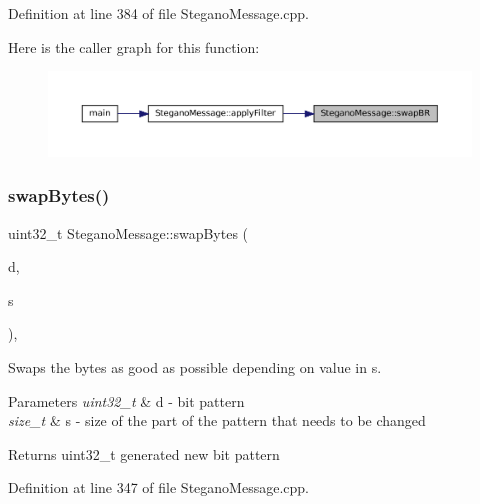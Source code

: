 Definition at line 384 of file Stegano\+Message.\+cpp.

Here is the caller graph for this function\+:\nopagebreak
\begin{figure}[H]
\begin{center}
\leavevmode
\includegraphics[width=350pt]{classSteganoMessage_a530e5ee67cf45ac56f8f3be4d2b44d2e_icgraph}
\end{center}
\end{figure}
\mbox{\label{classSteganoMessage_af80189e6fb64aa4ae6cc48f92eaec147}} 
\subsubsection{\texorpdfstring{swapBytes()}{swapBytes()}}
{\footnotesize\ttfamily uint32\+\_\+t Stegano\+Message\+::swap\+Bytes (\begin{DoxyParamCaption}\item[{uint32\+\_\+t}]{d,  }\item[{size\+\_\+t}]{s }\end{DoxyParamCaption})\hspace{0.3cm}{\ttfamily [static]}, {\ttfamily [private]}}



Swaps the bytes as good as possible depending on value in s. 


\begin{DoxyParams}{Parameters}
{\em uint32\+\_\+t} & d -\/ bit pattern \\
\hline
{\em size\+\_\+t} & s -\/ size of the part of the pattern that needs to be changed \\
\hline
\end{DoxyParams}
\begin{DoxyReturn}{Returns}
uint32\+\_\+t generated new bit pattern 
\end{DoxyReturn}


Definition at line 347 of file Stegano\+Message.\+cpp.

